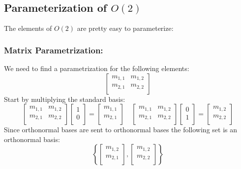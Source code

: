 \subsection{Parameterization of $O(2)$}
The elements of $O(2)$ are pretty easy to parameterize: 

\subsubsection{Matrix Parametrization:}
We need to find a parametrization for the following elements:
\[
\begin{bmatrix}
	m_{1,1}&m_{1,2} \\
	m_{2,1}&m_{2,2} \\
\end{bmatrix}
\]
Start by multiplying the standard basis: 
\[
\begin{bmatrix}
	m_{1,1}&m_{1,2} \\
	m_{2,1}&m_{2,2} \\
\end{bmatrix}
\begin{bmatrix}
	1\\0\\
\end{bmatrix}
=
\begin{bmatrix}
	m_{1,1} \\ m_{2,1}\\
\end{bmatrix}
\quad
\begin{bmatrix}
	m_{1,1}&m_{1,2} \\
	m_{2,1}&m_{2,2} \\
\end{bmatrix}
\begin{bmatrix}
	0\\1\\
\end{bmatrix}
=
\begin{bmatrix}
	m_{1,2} \\ m_{2,2}\\
\end{bmatrix}
\]
Since orthonormal bases are sent to orthonormal bases the following set is an orthonormal basis:
\[
\left\{
\begin{bmatrix}
	m_{1,2} \\ m_{2,1}\\
\end{bmatrix}
,
\begin{bmatrix}
	m_{1,2} \\ m_{2,2}\\
\end{bmatrix}
\right\}
\]
